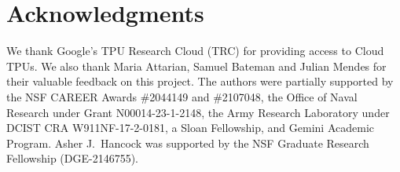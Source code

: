 \section*{Acknowledgments}

We thank Google’s TPU Research Cloud (TRC) for providing access to Cloud TPUs. We also thank Maria Attarian, Samuel Bateman and Julian Mendes for their valuable feedback on this project.
The authors were partially supported by the NSF CAREER Awards \#2044149 and \#2107048, 
the Office of Naval Research under Grant N00014-23-1-2148, the Army Research Laboratory under DCIST CRA W911NF-17-2-0181, a Sloan Fellowship, and Gemini Academic Program. Asher J.~Hancock was supported by the NSF Graduate Research Fellowship (DGE-2146755).